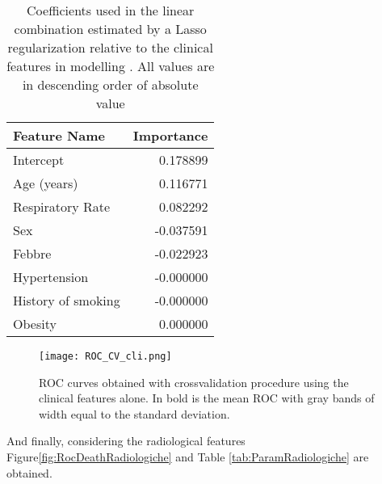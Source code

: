 \begin{table}
\caption{Coefficients used in the linear combination estimated by a Lasso regularization relative to the clinical features in modelling \death. All values are in descending order of absolute value\label{tab:ParamCli}}
\centering
	\begin{tabular}{lr}
		\toprule
		Feature Name &   Importance \\
		\midrule
		Intercept          &                      0.178899 \\
		Age (years)        &                      0.116771 \\
		Respiratory Rate   &                      0.082292 \\
		Sex           &                     -0.037591 \\
		Febbre             &                     -0.022923 \\
		Hypertension       &                     -0.000000 \\
		History of smoking &                     -0.000000 \\
		Obesity            &                      0.000000 \\
		\bottomrule
	\end{tabular}
\end{table}

\begin{figure}[htbp]
	\centering
  		\texttt{[image: ROC\_CV\_cli.png]}
        \caption{ROC curves obtained with crossvalidation procedure using the clinical features alone. In bold is the mean ROC with gray bands of width equal to the standard deviation.\label{fig:RocDeathCli}}
\end{figure}

And finally, considering the radiological features Figure\ref{fig:RocDeathRadiologiche} and Table \ref{tab:ParamRadiologiche} are obtained.


